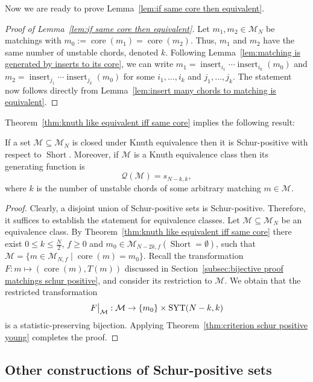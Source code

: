 \documentclass[ALCO]{cedram}
\newcommand{\Syt}{\operatorname{SYT}}
\newcommand{\Short}{\operatorname{Short}}
\newcommand{\core}{\operatorname{core}}
\newcommand{\insrt}{\operatorname{insert}}
\newcommand{\Q}{\mathcal{Q}}
\newcommand{\M}{\mathcal{M}}
\newcommand\restr[2]{{%
  \left.\kern-\nulldelimiterspace %
  #1 %
  \vphantom{\big|} %
  \right|_{#2} %
  }}
\begin{document}
Now we are ready to prove Lemma~\ref{lem:if same core then equivalent}.
\begin{proof}[Proof of Lemma~\ref{lem:if same core then equivalent}]
    Let $m_1, m_2 \in \M_N$ be matchings with $m_0 := \core(m_1) = \core(m_2)$. Thus, $m_1$ and $m_2$ have the same number of unstable chords, denoted $k$. Following Lemma~\ref{lem:matching is generated by inserts to its core}, we can write $m_1 = \insrt_{i_1}\cdots\insrt_{i_k}(m_0)$ and $m_2 = \insrt_{j_1}\cdots\insrt_{j_k}(m_0)$ for some $i_1,\dots,i_k$ and $j_1,\dots,j_k$. The statement now follows directly from Lemma~\ref{lem:insert many chords to matching is equivalent}.%
\end{proof}


    


Theorem~\ref{thm:knuth like equivalent iff same core} implies the following result:
\begin{corollary}
\label{cor:closed under knuth like is schur positive}
    If a set $\M \subseteq \M_N$ is closed under Knuth equivalence then it is Schur-positive with respect to $\Short$. Moreover, if $\M$ is a Knuth equivalence class then its generating function is
    \[
        \Q(\M) = s_{N-k,k},
    \]
    where $k$ is the number of unstable chords of some arbitrary matching $m \in \M$.
\end{corollary}

\begin{proof}
    Clearly, a disjoint union of Schur-positive sets is Schur-positive. Therefore, it suffices to establish the statement for equivalence classes. Let $\M \subseteq \M_N$ be an equivalence class. By Theorem~\ref{thm:knuth like equivalent iff same core} there exist $0 \le k \le \frac{N}{2}$, $f \ge 0$ and $m_0 \in \M_{N-2k,f}(\Short=\emptyset)$, such that $\M = \{m \in \M_{N,f} \mid \core(m) = m_0\}$. Recall the transformation $F:m \mapsto (\core(m),T(m))$ discussed in Section~\ref{subsec:bijective proof matchings schur positive}, and consider its restriction to $\M$. We obtain that the restricted transformation
    \[
        \restr{F}{\M}:\M \to \{m_0\} \times \Syt(N-k,k)
    \]
    is a statistic-preserving bijection. Applying Theorem~\ref{thm:criterion schur positive young} completes the proof.
\end{proof}

\subsection{Other constructions of Schur-positive sets}
\end{document}
